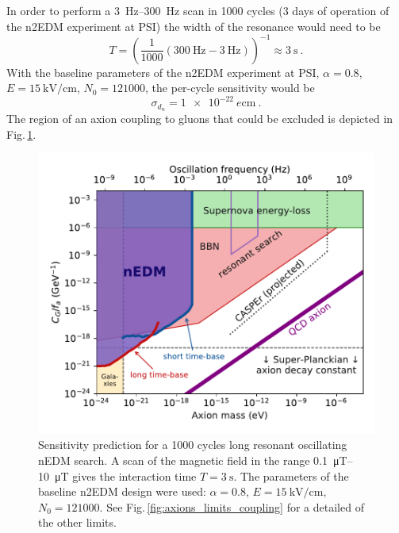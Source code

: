 In order to perform a \SIrange[range-phrase=--]{3}{300}{\hertz} scan in 1000 cycles (3 days of operation of the n2EDM experiment at PSI) the width of the resonance would need to be
\begin{equation}
  T = {\left( \frac{1}{1000} \left( \SI{300}{\hertz} - \SI{3}{\hertz} \right)  \right)}^{-1} \approx \SI{3}{\second} \ .
\end{equation}
With the baseline parameters of the n2EDM experiment at PSI, $\alpha = 0.8$, $E = \SI{15}{\kilo\volt\per\centi\metre}$, $N_0 = \num{121000}$, the per-cycle sensitivity would be 
\begin{equation}
  \sigma_{d_n} = \SI{1e-22}{\elementarycharge\centi\metre} \ .
\end{equation}
The region of an axion coupling to gluons that could be excluded is depicted in Fig.\,\ref{fig:axions_prediction}.

\begin{figure}
  \centering
  \includegraphics[width=\linewidth]{gfx/axions/resonant_search_exclusion_1000cycles_n2EDM.pdf}
  \caption{Sensitivity prediction for a 1000 cycles long resonant oscillating nEDM search. A scan of the magnetic field in the range \SIrange[range-phrase=--]{0.1}{10}{\micro\tesla} gives the interaction time $T = \SI{3}{\second}$. The parameters of the baseline n2EDM design were used: $\alpha = 0.8$, $E = \SI{15}{\kilo\volt\per\centi\metre}$, $N_0 = \num{121000}$. See Fig.\,\ref{fig:axions_limits_coupling} for a detailed of the other limits.}\label{fig:axions_prediction}
\end{figure}

